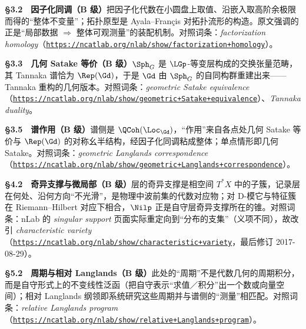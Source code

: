 \smallskip
\noindent\textbf{§3.2　因子化同调（B 级）}\quad 把因子化代数在小圆盘上取值、沿嵌入取高阶余极限而得的“整体不变量”；拓扑原型是 Ayala--Françis 对拓扑流形的构造。原文强调的正是“局部数据 $\Rightarrow$ 整体可观测量”的装配机制。对照词条：\emph{factorization homology}（\href{https://ncatlab.org/nlab/show/factorization+homology}{\texttt{https:/\allowbreak{}/\allowbreak{}ncatlab.\allowbreak{}org/\allowbreak{}nlab/\allowbreak{}show/\allowbreak{}factorization+\allowbreak{}homology}}）。

\smallskip
\noindent\textbf{§3.3　几何 Satake 等价（B 级）}\quad $\Sph_{G}$ 是 $\LGp$-等变层构成的交换张量范畴，其 Tannaka 谱恰为 $\Rep(\Gd)$，于是 $\Gd$ 由 $\Sph_{G}$ 的自同构群重建出来——Tannaka 重构的几何版本。对照词条：\emph{geometric Satake equivalence}（\href{https://ncatlab.org/nlab/show/geometric+Satake+equivalence}{\texttt{https:/\allowbreak{}/\allowbreak{}ncatlab.\allowbreak{}org/\allowbreak{}nlab/\allowbreak{}show/\allowbreak{}geometric+\allowbreak{}Satake+\allowbreak{}equivalence}}）、\emph{Tannaka duality}。

\smallskip
\noindent\textbf{§3.5　谱作用（B 级）}\quad 谱侧是 $\QCoh(\Loc_{\Gd})$，“作用”来自各点处几何 Satake 等价与 $\Rep(\Gd)$ 的对称幺半结构，经因子化同调粘成整体；单点情形即几何 Satake。对照词条：\emph{geometric Langlands correspondence}（\href{https://ncatlab.org/nlab/show/geometric+Langlands+correspondence}{\texttt{https:/\allowbreak{}/\allowbreak{}ncatlab.\allowbreak{}org/\allowbreak{}nlab/\allowbreak{}show/\allowbreak{}geometric+\allowbreak{}Langlands+\allowbreak{}correspondence}}）。

\smallskip
\noindent\textbf{§4.2　奇异支撑与微局部（B 级）}\quad 层的奇异支撑是相空间 $T^{*}X$ 中的子簇，记录层在何处、沿何方向“不光滑”，是物理中波前集的代数对应物；对 D-模它与特征簇在 Riemann--Hilbert 对应下相合，$\Nilp$ 正是自守层奇异支撑所在的锥。对照词条：nLab 的 \emph{singular support} 页面实际重定向到“分布的支集”（义项不同），故改引 \emph{characteristic variety}（\href{https://ncatlab.org/nlab/show/characteristic+variety}{\texttt{https:/\allowbreak{}/\allowbreak{}ncatlab.\allowbreak{}org/\allowbreak{}nlab/\allowbreak{}show/\allowbreak{}characteristic+\allowbreak{}variety}}，最后修订 2017-08-29）。

\smallskip
\noindent\textbf{§5.2　周期与相对 Langlands（B 级）}\quad 此处的“周期”不是代数几何的周期积分，而是自守形式上的不变线性泛函（把自守表示“求值／积分”出一个数或向量空间）；相对 Langlands 纲领即系统研究这些周期并与谱侧的“测量”相匹配。对照词条：\emph{relative Langlands program}（\href{https://ncatlab.org/nlab/show/relative+Langlands+program}{\texttt{https:/\allowbreak{}/\allowbreak{}ncatlab.\allowbreak{}org/\allowbreak{}nlab/\allowbreak{}show/\allowbreak{}relative+\allowbreak{}Langlands+\allowbreak{}program}}）。

